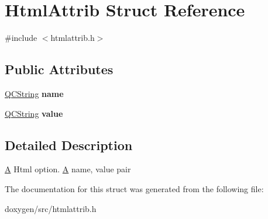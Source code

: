 \hypertarget{struct_html_attrib}{}\section{Html\+Attrib Struct Reference}
\label{struct_html_attrib}


{\ttfamily \#include $<$htmlattrib.\+h$>$}

\subsection*{Public Attributes}
\begin{DoxyCompactItemize}
\item 
\mbox{\label{struct_html_attrib_a89bb7f09a717b34af2fc9b5466adad63}} 
\mbox{\hyperlink{class_q_c_string}{Q\+C\+String}} {\bfseries name}
\item 
\mbox{\label{struct_html_attrib_a81dc2fb244be20f88455fe84b4f91995}} 
\mbox{\hyperlink{class_q_c_string}{Q\+C\+String}} {\bfseries value}
\end{DoxyCompactItemize}


\subsection{Detailed Description}
\mbox{\hyperlink{class_a}{A}} Html option. \mbox{\hyperlink{class_a}{A}} name, value pair 

The documentation for this struct was generated from the following file\+:\begin{DoxyCompactItemize}
\item 
doxygen/src/htmlattrib.\+h\end{DoxyCompactItemize}

